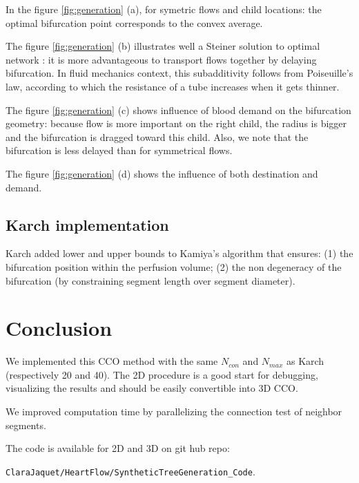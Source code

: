 \documentclass[a4paper, 11pt]{article} %
\begin{document}
In the figure \ref{fig:generation} (a), for symetric flows and child locations: the optimal bifurcation point corresponds to the convex average.

The figure \ref{fig:generation} (b) illustrates well a Steiner solution to optimal network \cite{bernot2009optimal}: it is more advantageous to transport flows together by delaying bifurcation. In fluid mechanics context, this subadditivity follows from Poiseuille's law, according to which the resistance of a tube increases when it gets thinner.

The figure \ref{fig:generation} (c) shows influence of blood demand on the bifurcation geometry: because flow is more important on the right child, the radius is bigger and the bifurcation is dragged toward this child. Also, we note that the bifurcation is less delayed than for symmetrical flows.

The figure \ref{fig:generation} (d) shows the influence of both destination and demand.


\subsection*{Karch implementation}

Karch added lower and upper bounds to Kamiya's algorithm that ensures:
(1) the bifurcation position within the perfusion volume; (2)
the non degeneracy of the bifurcation (by constraining segment length over segment diameter).



\section*{Conclusion}

We implemented this CCO method with the same $N_{con}$ and $N_{max}$ as Karch (respectively 20 and 40). The 2D procedure is a good start for debugging, visualizing the results and should be easily convertible into 3D CCO.


We improved computation time by parallelizing the connection test of neighbor segments.

The code is available for 2D and 3D on git hub repo:

 \verb|ClaraJaquet/HeartFlow/SyntheticTreeGeneration_Code|.

\clearpage
\end{document}
